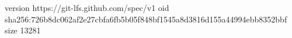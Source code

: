 version https://git-lfs.github.com/spec/v1
oid sha256:726b8dc062af2e27cbfa6fb5b05f848bf1545a8d3816d155a44994ebb8352bbf
size 13281
